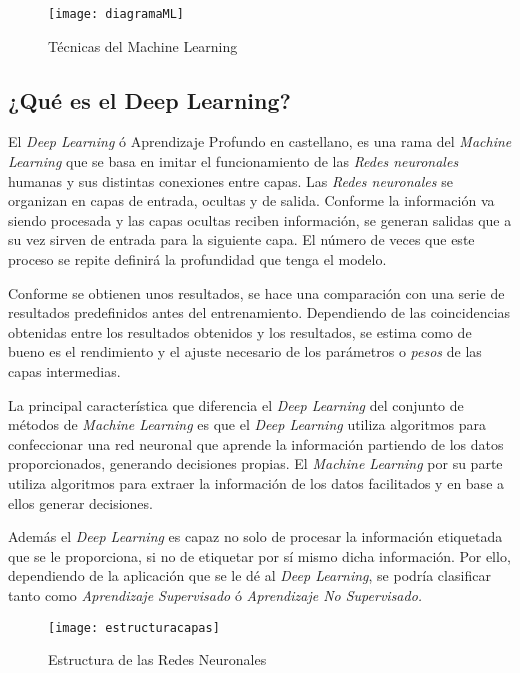 \begin{figure}[htb]
	\centering
	\texttt{[image: diagramaML]}
	\caption[Técnicas del Machine Learning]{Técnicas del Machine Learning}
\end{figure}

\clearpage

\subsection{¿Qué es el Deep Learning?}
El \emph{Deep Learning} ó Aprendizaje Profundo en castellano, es una rama del \emph{Machine Learning} que se basa en imitar el funcionamiento de las \emph{Redes neuronales} humanas y sus distintas conexiones entre capas. Las \emph{Redes neuronales} se organizan en capas de entrada, ocultas y de salida. Conforme la información va siendo procesada y las capas ocultas reciben información, se generan salidas que a su vez sirven de entrada para la siguiente capa. El número de veces que este proceso se repite definirá la profundidad que tenga el modelo.

Conforme se obtienen unos resultados, se hace una comparación con una serie de resultados predefinidos antes del entrenamiento. Dependiendo de las coincidencias obtenidas entre los resultados obtenidos y los resultados, se estima como de bueno es el rendimiento y el ajuste necesario de los parámetros o \emph{pesos} de las capas intermedias.

La principal característica que diferencia el \emph{Deep Learning} del conjunto de métodos de \emph{Machine Learning} es que el \emph{Deep Learning} utiliza algoritmos para confeccionar una red neuronal que aprende la información partiendo de los datos proporcionados, generando decisiones propias. El \emph{Machine Learning} por su parte utiliza algoritmos para extraer la información de los datos facilitados y en base a ellos generar decisiones. 

Además el \emph{Deep Learning} es capaz no solo de procesar la información etiquetada que se le proporciona, si no de etiquetar por sí mismo dicha información. Por ello, dependiendo de la aplicación que se le dé al \emph{Deep Learning}, se podría clasificar tanto como \emph{Aprendizaje Supervisado} ó \emph{Aprendizaje No Supervisado.}


\begin{figure}[htb]
	\centering
	\texttt{[image: estructuracapas]}
	\caption[Estructura de las Redes Neuronales]{Estructura de las Redes Neuronales}
\end{figure}


